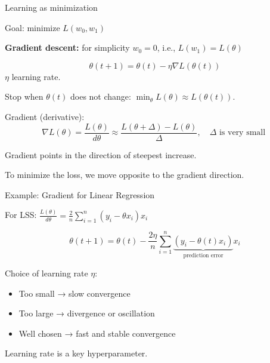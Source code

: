 \documentclass{beamer}
\begin{document}
\begin{frame}{Learning as minimization}

Goal: minimize $L(w_0,w_1)$


\textbf{Gradient descent:}
for simplicity $w_0=0$, i.e., $L(w_1)=L(\theta)$

\[
\theta(t+1) = \theta(t) - \eta \nabla L(\theta(t))
\]
$\eta$ learning rate. 

\medskip

Stop when $\theta(t)$ does not change:
\( \min_{\theta} L(\theta) \approx L(\theta(t)) \).

\medskip 

Gradient (derivative):
\[
   \nabla L(\theta)=\frac{L(\theta)}{d\theta} \approx \frac{L(\theta+\Delta)-L(\theta)}{\Delta}, \quad \Delta \mbox{ is very small }
\]

Gradient points in the direction of steepest increase.

\medskip

To minimize the loss, we move opposite to the gradient direction.

\end{frame}
\begin{frame}{Example: Gradient for Linear Regression}

For LSS:
\(
  \frac{L(\theta)}{d\theta} = 
   \frac{2}{n} \sum_{i=1}^n (y_i - \theta x_i)x_i
\)

\[
\theta(t+1) = \theta(t) - 
   \frac{2\eta}{n} \sum_{i=1}^n \underbrace{(y_i - \theta(t) x_i)}_{\mbox{prediction error}}x_i
\]

Choice of learning rate $\eta$:

\begin{itemize}
    \item Too small → slow convergence
    \item Too large → divergence or oscillation
    \item Well chosen → fast and stable convergence
\end{itemize}

\vspace{0.5cm}

Learning rate is a key hyperparameter.

\end{frame}
\end{document}
